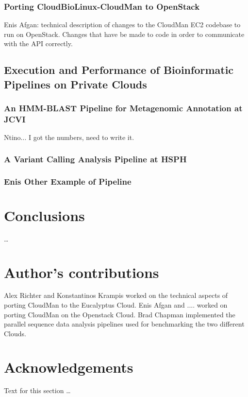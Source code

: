 \documentclass[10pt]{bmc_article}
\newenvironment{bmcformat}{\baselineskip20pt\sloppy\setboolean{publ}{false}}{\baselineskip20pt\sloppy}
\begin{document}
\begin{bmcformat}
\subsubsection*{Porting CloudBioLinux-CloudMan to OpenStack}
Enis Afgan: technical description of changes to the CloudMan EC2 codebase to run on OpenStack.  Changes that have be
made to code in order to communicate with the API correctly. \pb

\subsection*{Execution and Performance of Bioinformatic Pipelines on Private Clouds} 

\subsubsection*{An HMM-BLAST Pipeline for Metagenomic Annotation at JCVI}
Ntino... I got the numbers, need to write it. \pb

\subsubsection*{A Variant Calling Analysis Pipeline at HSPH}
\pb

\subsubsection*{Enis Other Example of Pipeline}
\pb

\section*{Conclusions}  \ldots


\bigskip

\section*{Author's contributions}
    Alex Richter and Konstantinos Krampis worked on the technical aspects of porting CloudMan
    to the Eucalyptus Cloud. Enis Afgan and .... worked on porting CloudMan on the Openstack
    Cloud. Brad Chapman implemented the parallel sequence data analysis pipelines used for benchmarking
    the two different Clouds.

    

\section*{Acknowledgements}
  Text for this section \ldots
 

\end{bmcformat}
\end{document}
